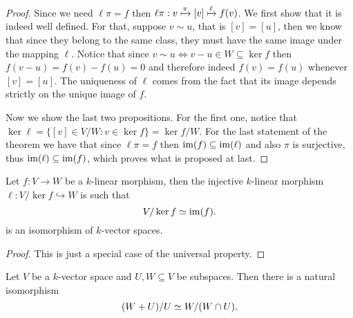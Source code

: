\begin{proof}
    Since we need \(\ell  \pi = f\) then \(\ell  \pi : v \xmapsto \pi
    [v] \xmapsto \ell f(v)\). We first show that it is indeed well
    defined. For that, suppose \(v \sim u\), that is \([v] =
    [u]\), then we know that since they belong to the same class, they must have the
    same image under the mapping \(\ell\). Notice that since \(v \sim u
    \Leftrightarrow v - u \in W \subseteq \ker f\) then \(f(v - u) = f(v) - f(u) =
    0\) and therefore indeed \(f(v) = f(u)\) whenever \([v] =
    [u]\). The uniqueness of \(\ell\) comes from the fact that its image depends
    strictly on the unique image of \(f\).

    Now we show the last two propositions. For the first one, notice that \(\ker
    \ell = \{[v] \in V/W \colon v \in \ker f\} = \ker f / W\). For the last
    statement of the theorem we have that since \(\ell  \pi = f\) then
    \(\operatorname{im}(f) \subseteq \operatorname{im}(\ell)\) and also \(\pi\) is surjective, thus
    \(\operatorname{im}(\ell) \subseteq \operatorname{im}(f)\), which proves what is proposed at last.
\end{proof}

\begin{theorem}\label{thm: first isomorphism}
    Let \(f : V \to W\) be a \(k\)-linear morphism, then the injective
    \(k\)-linear morphism \(\ell : V / \ker f \hookrightarrow W\) is such that
    \[
        V / \ker f \simeq \operatorname{im}(f).
    \]
    is an isomorphism of \(k\)-vector spaces.
\end{theorem}

\begin{proof}
    This is just a special case of the universal property.
\end{proof}

\begin{theorem}\label{thm: second isomorphism}
    Let \(V\) be a \(k\)-vector space and \(U, W \subseteq V\) be subspaces. Then
    there is a natural isomorphism
    \[
        (W + U)/U \simeq W/(W \cap U).
    \]
\end{theorem}

